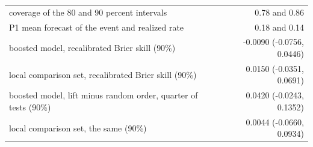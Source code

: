\begin{tabular}{lr}
coverage of the 80 and 90 percent intervals & 0.78 and 0.86 \\
P1 mean forecast of the event and realized rate & 0.18 and 0.14 \\
boosted model, recalibrated Brier skill (90\%) & -0.0090 (-0.0756, 0.0446) \\
local comparison set, recalibrated Brier skill (90\%) & 0.0150 (-0.0351, 0.0691) \\
boosted model, lift minus random order, quarter of tests (90\%) & 0.0420 (-0.0243, 0.1352) \\
local comparison set, the same (90\%) & 0.0044 (-0.0660, 0.0934) \\

\end{tabular}
